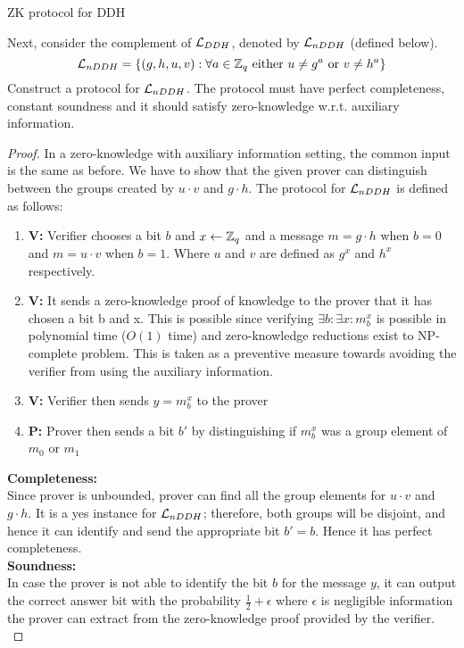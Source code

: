 \begin{solution}{ZK protocol for DDH}\label{ques:23}
    \begin{question}
    Next, consider the complement of $\mathcal{L}_{DDH}$, denoted by $\mathcal{L}_{nDDH}$ (defined below).
    \begin{equation}
        \mathcal{L}_{nDDH} = \{(g,h,u,v): \forall a \in \mathbb{Z}_q \text{ either } u \neq g^a \text{ or } v \neq h^a \}
    \end{equation}
    Construct a protocol for $\mathcal{L}_{nDDH}$. The protocol must have perfect completeness, constant soundness and it should satisfy zero-knowledge w.r.t. auxiliary information.
    \end{question}
    \tcblower{}
    \begin{proof}
    In a zero-knowledge with auxiliary information setting, the common input is the same as before. We have to show that the given prover can distinguish between the groups created by $u\cdot v$ and $g \cdot h$. The protocol for $\mathcal{L}_{nDDH}$ is defined as follows:
    \begin{enumerate}
        \item \textbf{V:} Verifier chooses a bit $b$ and $x\leftarrow \mathbb{Z}_q$ and a message $m=g\cdot h$ when $b = 0$ and $m = u \cdot v$ when $b = 1$. Where $u$ and $v$ are defined as $g^x$ and $h^x$ respectively.
        \item \textbf{V:} It sends a zero-knowledge proof of knowledge to the prover that it has chosen a bit b and x. This is possible since verifying $\exists b : \exists x : m_b^x$ is possible in polynomial time ($O(1)$ time) and zero-knowledge reductions exist to NP-complete problem. This is taken as a preventive measure towards avoiding the verifier from using the auxiliary information.
        \item \textbf{V:} Verifier then sends $y = m_b^x$ to the prover
        \item \textbf{P:} Prover then sends a bit $b'$ by distinguishing if $m_b^x$ was a group element of $m_0$ or $m_1$
    \end{enumerate}
    \textbf{Completeness:}\\
    Since prover is unbounded, prover can find all the group elements for $u\cdot v$ and $g\cdot h$. It is a yes instance for $\mathcal{L}_{nDDH}$; therefore, both groups will be disjoint, and hence it can identify and send the appropriate bit $b' = b$. Hence it has perfect completeness.\\
    
    \textbf{Soundness:}\\
    In case the prover is not able to identify the bit $b$ for the message $y$, it can output the correct answer bit with the probability $\frac{1}{2}+\epsilon$ where $\epsilon$ is negligible information the prover can extract from the zero-knowledge proof provided by the verifier. \\
    

\end{proof}
\end{solution}
